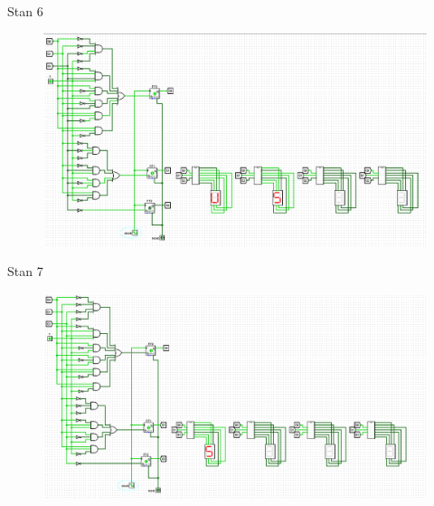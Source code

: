 \documentclass[]{article}
\begin{document}
\newpage
Stan 6
\begin{figure}[H]
	\centering
	\includegraphics[width=1.2\textwidth]{6.png}
\end{figure}
\newpage
Stan 7
\begin{figure}[H]
	\centering
	\includegraphics[width=1.2\textwidth]{7.png}
\end{figure}
\end{document}
